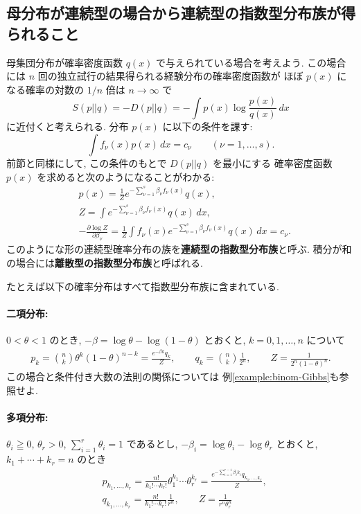 \documentclass[12pt,twoside]{jarticle}
\renewcommand\d{\partial}
\theoremstyle{jplain}
\theoremstyle{jplain}
\theoremstyle{jplain}
\numberwithin{theorem}{section}
\numberwithin{equation}{section}
\numberwithin{figure}{section}
\numberwithin{table}{section}
\newcommand\exampleref[1]{例\ref{#1}}
\begin{document}

\subsection{母分布が連続型の場合から連続型の指数型分布族が得られること}

母集団分布が確率密度函数 $q(x)$ で与えられている場合を考えよう.
この場合には $n$ 回の独立試行の結果得られる経験分布の確率密度函数が
ほぼ $p(x)$ になる確率の対数の $1/n$ 倍は $n\to\infty$ で
\[
S(p||q)=-D(p||q) = -\int p(x)\log\frac{p(x)}{q(x)}\,dx
\]
に近付くと考えられる. 分布 $p(x)$ に以下の条件を課す:
\[
\int f_\nu(x)p(x)\,dx = c_\nu
\qquad (\nu=1,\ldots,s).
\]
前節と同様にして, この条件のもとで $D(p||q)$ を最小にする
確率密度函数 $p(x)$ を求めると次のようになることがわかる:
\begin{align*}
&
p(x)=\frac{1}{Z}e^{-\sum_{\nu=1}^s \beta_\nu f_\nu(x)}q(x), 
\\ &
Z=\int e^{-\sum_{\nu=1}^s \beta_\nu f_\nu(x)}q(x)\,dx,
\\ &
-\frac{\d\log Z}{\d\beta_\nu} 
= \frac{1}{Z}\int f_\nu(x) e^{-\sum_{\nu=1}^s \beta_\nu f_\nu(x)}q(x) \,dx
= c_\nu.
\end{align*}
このようにな形の連続型確率分布の族を{\bf 連続型の指数型分布族}と呼ぶ.
積分が和の場合には{\bf 離散型の指数型分布族}と呼ばれる.

たとえば以下の確率分布はすべて指数型分布族に含まれている.

\paragraph{二項分布:} $0<\theta<1$ のとき,
$-\beta=\log\theta-\log(1-\theta)$ とおくと, $k=0,1,\ldots,n$ について
\begin{align*}
p_k 
= \binom{n}{k} \theta^k(1-\theta)^{n-k}
=\frac{e^{-\beta k}q_k}{Z},
\qquad
q_k = \binom{n}{k}\frac{1}{2^n}, 
\qquad
Z = \frac{1}{2^n(1-\theta)^n}.
\end{align*}
この場合と条件付き大数の法則の関係については
\exampleref{example:binom-Gibbs}も参照せよ.

\paragraph{多項分布:} $\theta_i\geqq 0$, $\theta_r>0$, $\sum_{i=1}^r\theta_i=1$ であるとし, 
$-\beta_i=\log\theta_i-\log\theta_r$ とおくと, \\
$k_1+\cdots+k_r=n$ のとき
\begin{align*}
&
p_{k_1,\ldots,k_r}
=
\frac{n!}{k_1!\cdots k_r!}\theta_1^{k_1}\cdots \theta_r^{k_r}
=\frac{e^{-\sum_{i=1}^{r-1}\beta_i k_i}q_{k_1,\ldots,k_r}}{Z},
\\ &
q_{k_1,\ldots,k_r}
=\frac{n!}{k_1!\cdots k_r!}\frac{1}{r^n},
\qquad
Z=\frac{1}{r^n\theta_r^n}
\end{align*}
\end{document}
